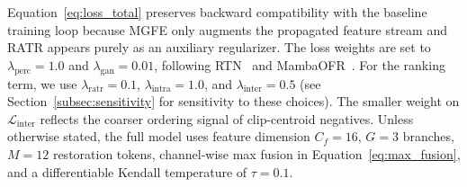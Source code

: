 Equation~\eqref{eq:loss_total} preserves backward compatibility with the baseline training loop because MGFE only augments the propagated feature stream and RATR appears purely as an auxiliary regularizer. The loss weights are set to $\lambda_{\mathrm{perc}}=1.0$ and $\lambda_{\mathrm{gan}}=0.01$, following RTN~\cite{wan2022rtn} and MambaOFR~\cite{mao2025mambaofr}. For the ranking term, we use $\lambda_{\mathrm{ratr}}=0.1$, $\lambda_{\mathrm{intra}}=1.0$, and $\lambda_{\mathrm{inter}}=0.5$ (see Section~\ref{subsec:sensitivity} for sensitivity to these choices). The smaller weight on $\mathcal{L}_{\text{inter}}$ reflects the coarser ordering signal of clip-centroid negatives. Unless otherwise stated, the full model uses feature dimension $C_f=16$, $G=3$ branches, $M=12$ restoration tokens, channel-wise max fusion in Equation~\eqref{eq:max_fusion}, and a differentiable Kendall temperature of $\tau=0.1$.

